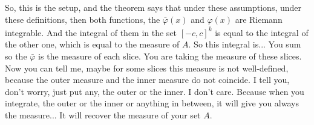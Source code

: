 \begin{spoken-clean}[00:02:20 - 00:03:20]
So, this is the setup, and the theorem says that under these assumptions, under these definitions, then both functions, the $\bar{\varphi}(x)$ and $\underline{\varphi}(x)$ are Riemann integrable. And the integral of them in the set $[-c,c]^k$ is equal to the integral of the other one, which is equal to the measure of $A$. So this integral is... You sum so the $\bar{\varphi}$ is the measure of each slice. You are taking the measure of these slices. Now you can tell me, maybe for some slices this measure is not well-defined, because the outer measure and the inner measure do not coincide. I tell you, don't worry, just put any, the outer or the inner. I don't care. Because when you integrate, the outer or the inner or anything in between, it will give you always the measure... It will recover the measure of your set $A$.
\end{spoken-clean}

